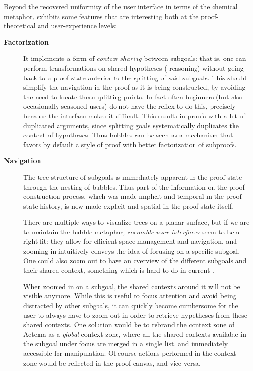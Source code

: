Beyond the recovered uniformity of the user interface in terms of the chemical
metaphor,  exhibits some features that are interesting both at the
proof-theoretical and user-experience levels:
\begin{description}
  \item[\textbf{Factorization}] It implements a form of \emph{context-sharing}
    between subgoals: that is, one can perform transformations on shared
    hypotheses ( reasoning) without going back to a proof state anterior
    to the splitting of said subgoals. This should simplify the navigation in
    the proof as it is being constructed, by avoiding the need to locate these
    splitting points. In fact often beginners (but also occasionally seasoned
    users) do not have the reflex to do this, precisely because the interface
    makes it difficult. This results in proofs with a lot of duplicated
    arguments, since splitting goals systematically duplicates the context of
    hypotheses. Thus bubbles can be seen as a mechanism that favors by default a
    style of proof with better factorization of
    subproofs.\label{par:factorization}

  \item[\textbf{Navigation}] The tree structure of subgoals is immediately
    apparent in the proof state through the nesting of bubbles. Thus part of the
    information on the proof construction process, which was made implicit and
    temporal in the proof state history, is now made explicit and spatial in the
    proof state itself.
    
    There are multiple ways to visualize trees on a planar surface, but if we
    are to maintain the bubble metaphor, \emph{zoomable user interfaces} seem to
    be a right fit: they allow for efficient space management and navigation,
    and zooming in intuitively conveys the idea of focusing on a specific
    subgoal. One could also zoom out to have an overview of the different
    subgoals and their shared context, something which is hard to do in current
    .
    
    When zoomed in on a subgoal, the shared contexts around it will not be
    visible anymore. While this is useful to focus attention and avoid being
    distracted by other subgoals, it can quickly become cumbersome for the user
    to always have to zoom out in order to retrieve hypotheses from these shared
    contexts. One solution would be to rebrand the context zone of Actema as a
    \emph{global} context zone, where all the shared contexts available in the
    subgoal under focus are merged in a single list, and immediately accessible
    for manipulation. Of course actions performed in the context zone would be
    reflected in the proof canvas, and vice versa.


\end{description}
